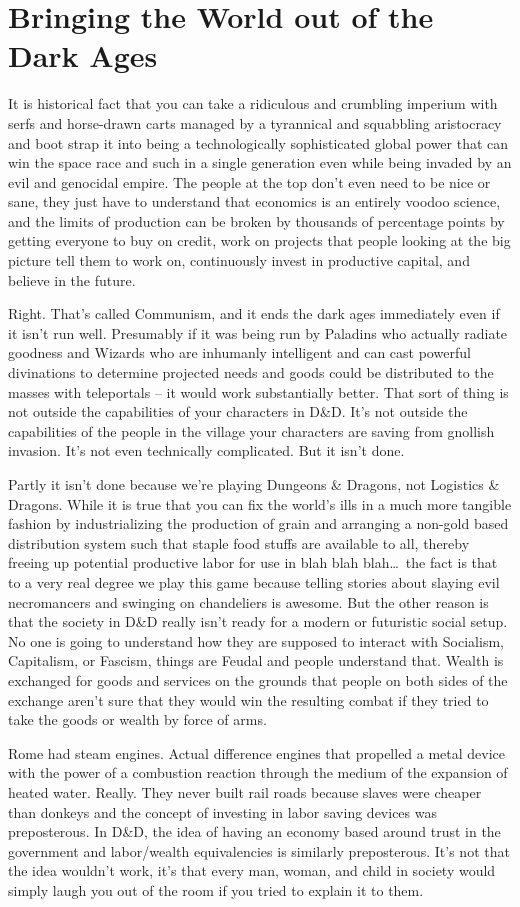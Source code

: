 \section{Bringing the World out of the Dark Ages}

It is historical fact that you can take a ridiculous and crumbling imperium with serfs and horse-drawn carts managed by a tyrannical and squabbling aristocracy and boot strap it into being a technologically sophisticated global power that can win the space race and such in a single generation even while being invaded by an evil and genocidal empire. The people at the top don't even need to be nice or sane, they just have to understand that economics is an entirely voodoo science, and the limits of production can be broken by thousands of percentage points by getting everyone to buy on credit, work on projects that people looking at the big picture tell them to work on, continuously invest in productive capital, and believe in the future.

Right. That's called Communism, and it ends the dark ages immediately even if it isn't run well. Presumably if it was being run by Paladins who actually radiate goodness and Wizards who are inhumanly intelligent and can cast powerful divinations to determine projected needs and goods could be distributed to the masses with teleportals -- it would work substantially better. That sort of thing is not outside the capabilities of your characters in D\&D. It's not outside the capabilities of the people in the village your characters are saving from gnollish invasion. It's not even technically complicated. But it isn't done.

Partly it isn't done because we're playing Dungeons \& Dragons, not Logistics \& Dragons. While it is true that you can fix the world's ills in a much more tangible fashion by industrializing the production of grain and arranging a non-gold based distribution system such that staple food stuffs are available to all, thereby freeing up potential productive labor for use in blah blah blah\ldots\  the fact is that to a very real degree we play this game because telling stories about slaying evil necromancers and swinging on chandeliers is awesome. But the other reason is that the society in D\&D really isn't ready for a modern or futuristic social setup. No one is going to understand how they are supposed to interact with Socialism, Capitalism, or Fascism, things are Feudal and people understand that. Wealth is exchanged for goods and services on the grounds that people on both sides of the exchange aren't sure that they would win the resulting combat if they tried to take the goods or wealth by force of arms.

Rome had steam engines. Actual difference engines that propelled a metal device with the power of a combustion reaction through the medium of the expansion of heated water. Really. They never built rail roads because slaves were cheaper than donkeys and the concept of investing in labor saving devices was preposterous. In D\&D, the idea of having an economy based around trust in the government and labor/wealth equivalencies is similarly preposterous. It's not that the idea wouldn't work, it's that every man, woman, and child in society would simply laugh you out of the room if you tried to explain it to them.
